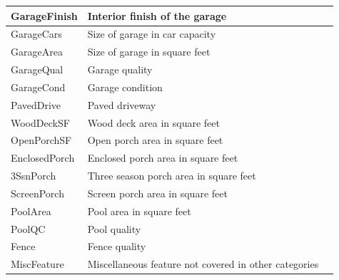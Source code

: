 \begin{longtable}{|l|p{3cm}|p{4cm}|}
    \hline
    GarageFinish     & Interior finish of the garage                                                                    \\
    \hline
    GarageCars       & Size of garage in car capacity                                                                   \\
    \hline
    GarageArea       & Size of garage in square feet                                                                    \\
    \hline
    GarageQual       & Garage quality                                                                                   \\
    \hline
    GarageCond       & Garage condition                                                                                 \\
    \hline
    PavedDrive       & Paved driveway                                                                                   \\
    \hline
    WoodDeckSF       & Wood deck area in square feet                                                                    \\
    \hline
    OpenPorchSF      & Open porch area in square feet                                                                   \\
    \hline
    EnclosedPorch    & Enclosed porch area in square feet                                                               \\
    \hline
    3SsnPorch        & Three season porch area in square feet                                                           \\
    \hline
    ScreenPorch      & Screen porch area in square feet                                                                 \\
    \hline
    PoolArea         & Pool area in square feet                                                                         \\
    \hline
    PoolQC           & Pool quality                                                                                     \\
    \hline
    Fence            & Fence quality                                                                                    \\
    \hline
    MiscFeature      & Miscellaneous feature not covered in other categories                                            \\

\end{longtable}
